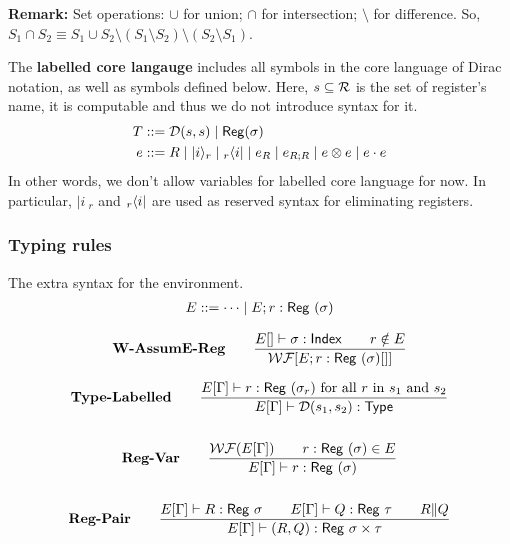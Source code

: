 \textbf{Remark: } Set operations: $\cup$ for union; $\cap$ for intersection; $\setminus$ for difference. So,
$ S_1 \cap S_2 \equiv S_1 \cup S_2 \setminus (S_1 \setminus S_2) \setminus (S_2 \setminus S_1) $.

\begin{definition}
  The \textbf{labelled core langauge} includes all symbols in the core language of Dirac notation, as well as symbols defined below.
  Here, $s\subseteq \mathcal{R}$ is the set of register's name, it is computable and thus we do not introduce syntax for it.
  \begin{align*}
    T & ::= \mathcal{D}(s,s) \mid \mathsf{Reg}(\sigma) \\
    e & ::= R \mid |i\rangle_r \mid {}_r\langle i| \mid e_R \mid e_{R;R} \mid  
    e \otimes e \mid e \cdot e \\
  \end{align*}
  In other words, we don't allow variables for labelled core language for now. In particular, $|i\>_r$ and ${}_r\langle i|$ are used as reserved syntax for eliminating registers.
\end{definition}

\subsubsection*{Typing rules}

The extra syntax for the environment.
\begin{gather}
    E ::= \dots \mid E; r : \mathsf{Reg}\ (\sigma)
\end{gather}

\begin{gather}
  \textbf{W-AssumE-Reg}\qquad 
  \frac{E[]\vdash \sigma : \mathsf{Index}\qquad r\notin E}{\mathcal{WF}[E; r : \mathsf{Reg}\ (\sigma)[]]}
\end{gather}

\begin{gather*}
  \textbf{Type-Labelled} \qquad
  \frac{E[\Gamma] \vdash r : \mathsf{Reg}\ (\sigma_r) \text{ for all $r$ in $s_1$ and $s_2$} }{E[\Gamma] \vdash \mathcal{D}(s_1, s_2) : \textsf{Type}} \\
  \\
  \textbf{Reg-Var} \qquad
  \frac{\mathcal{WF}(E[\Gamma]) \qquad r : \mathsf{Reg}\ (\sigma) \in E}{E[\Gamma] \vdash r : \mathsf{Reg}\ (\sigma)}  \\ 
  \\
  \textbf{Reg-Pair}\qquad
  \frac{E[\Gamma] \vdash R : \mathsf{Reg}\  \sigma\qquad E[\Gamma] \vdash Q : \mathsf{Reg}\  \tau\qquad R\| Q}{E[\Gamma] \vdash (R,Q) : \mathsf{Reg}\  \sigma \times \tau}
\end{gather*}

